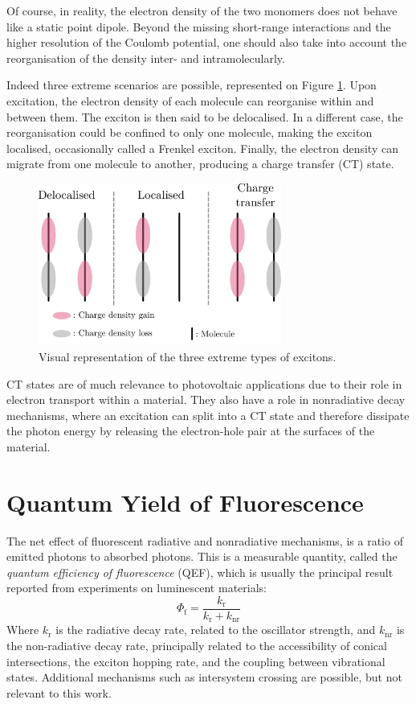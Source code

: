 Of course, in reality, the electron density of the two monomers does not behave like a static point dipole. Beyond the missing short-range interactions and the higher resolution of the Coulomb potential, one should also take into account the reorganisation of the density inter- and intramolecularly.\cite{Fornari2017}

Indeed three extreme scenarios are possible, represented on Figure \ref{fig:exciton_ex}. Upon excitation, the electron density of each molecule can reorganise within and between them. The exciton is then said to be delocalised. In a different case, the reorganisation could be confined to only one molecule, making the exciton localised, occasionally called a Frenkel exciton. Finally, the electron density can migrate from one molecule to another, producing a charge transfer (CT) state.\cite{Hestand2018}

\begin{figure}
\centering
\includegraphics[width=8cm]{Chapters/4Photochem/excitons_example.pdf}
\caption{Visual representation of the three extreme types of excitons.}
\label{fig:exciton_ex}
\end{figure}


CT states are of much relevance to photovoltaic applications due to their role in electron transport within a material. They also have a role in nonradiative decay mechanisms, where an excitation can split into a CT state and therefore dissipate the photon energy by releasing the electron-hole pair at the surfaces of the material.

\section{Quantum Yield of Fluorescence}
The net effect of fluorescent radiative and nonradiative mechanisms, is a ratio of emitted photons to absorbed photons. This is a measurable quantity, called the \textit{quantum efficiency of fluorescence} (QEF), which is usually the principal result reported from experiments on luminescent materials:
\begin{equation}
    \Phi_{\text{f}} = \frac{k_{\text{r}}}{k_{\text{r}} + k_{\text{nr}}}
\end{equation}
Where $k_{\text{r}}$ is the radiative decay rate, related to the oscillator strength, and $k_{\text{nr}}$ is the non-radiative decay rate, principally related to the accessibility of conical intersections, the exciton hopping rate, and the coupling between vibrational states. Additional mechanisms such as intersystem crossing are possible, but not relevant to this work.

